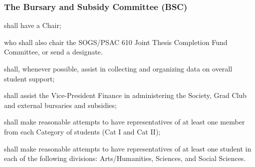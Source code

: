 \subsubsection{The Bursary and Subsidy Committee (BSC)}
\begin{longenum}[ label*=\thesubsubsection.\arabic*., align=left]
	\item shall have a Chair;
	 \begin{longenum}[ label*=\arabic*., align=left]
		\item who shall also chair the SOGS/PSAC 610 Joint Thesis Completion Fund Committee, or send a designate.
		\end{longenum}
    \item shall, whenever possible, assist in collecting and organizing data on overall student support; 
    \item shall assist the Vice-President Finance in administering the Society, Grad Club and external bursaries and subsidies;
    \item shall make reasonable attempts to have representatives of at least one member from each Category of students (Cat I and Cat II);
    \item shall make reasonable attempts to have representatives of at least one student in each of the following divisions: Arts/Humanities, Sciences, and Social Sciences.
\end{longenum}

